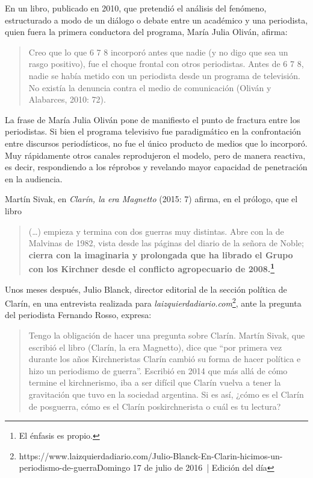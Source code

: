 En un libro, publicado en 2010, que pretendió el análisis del fenómeno, estructurado a modo de un diálogo o debate entre un académico y una periodista, quien fuera la primera conductora del programa, María Julia Oliván, afirma:

\begin{quote}
	Creo que lo que 6 7 8 incorporó antes que nadie (y no digo que sea un rasgo positivo), fue el choque frontal con otros periodistas. Antes de 6 7 8, nadie se había metido con un periodista desde un programa de televisión. No existía la denuncia contra el medio de comunicación (Oliván y Alabarces, 2010: 72).
\end{quote}


La frase de María Julia Oliván pone de manifiesto el punto de fractura entre los periodistas. Si bien el programa televisivo fue paradigmático en la confrontación entre discursos periodísticos, no fue el único producto de medios que lo incorporó. Muy rápidamente otros canales reprodujeron el modelo, pero de manera reactiva, es decir, respondiendo a los réprobos y revelando mayor capacidad de penetración en la audiencia.

Martín Sivak, en \emph{Clarín, la era Magnetto} (2015: 7) afirma, en el prólogo, que el libro

\begin{quote}
	(\dots) empieza y termina con dos guerras muy distintas. Abre con la de Malvinas de 1982, vista desde las páginas del diario de la señora de Noble; \textbf{cierra con la imaginaria y prolongada que ha librado el Grupo con los Kirchner desde el conflicto agropecuario de 2008.\footnote{El énfasis es propio.}}
\end{quote}


Unos meses después, Julio Blanck, director editorial de la sección política de Clarín, en una entrevista realizada para \emph{laizquierdadiario.com}\footnote{https://www.laizquierdadiario.com/Julio-Blanck-En-Clarin-hicimos-un-periodismo-de-guerraDomingo 17 de julio de 2016 | Edición del día}, ante la pregunta del periodista Fernando Rosso, expresa:

\begin{quote}
	Tengo la obligación de hacer una pregunta sobre Clarín. Martín Sivak, que escribió el libro (Clarín, la era Magnetto), dice que ``por primera vez durante los años Kirchneristas Clarín cambió su forma de hacer política e hizo un periodismo de guerra''. Escribió en 2014 que más allá de cómo termine el kirchnerismo, iba a ser difícil que Clarín vuelva a tener la gravitación que tuvo en la sociedad argentina. Si es así, ¿cómo es el Clarín de posguerra, cómo es el Clarín poskirchnerista o cuál es tu lectura?
\end{quote}


